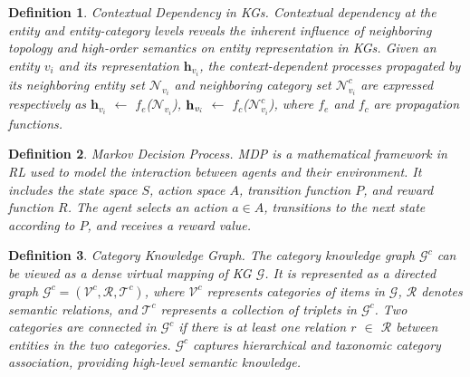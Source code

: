 \documentclass[conference]{IEEEtran}
\newtheorem{defn}{Definition}
\begin{document}
 \begin{defn}
 \emph{Contextual Dependency in KGs}.  Contextual dependency at the entity and entity-category levels reveals the inherent influence of neighboring topology and high-order semantics on entity representation in KGs. %
 Given an entity $v_i$ and its representation $\textbf{h}_{v_i}$, the context-dependent processes propagated by its neighboring entity set $\mathcal{N}_{v_i}$ and neighboring category set $\mathcal{N}^c_{v_i}$ are  expressed respectively as $\textbf{h}_{v_i}$ $\leftarrow$ $f_e$($\mathcal{N}_{v_i}$), $\textbf{h}_{\emph{v}_{\emph{i}}}$ $\leftarrow$ $f_c$($\mathcal{N}^c_{v_i}$), where $f_e$ and $f_c$ are propagation functions.





 
\end{defn}

\begin{defn}
 \emph{Markov Decision Process}. MDP is a mathematical framework in RL used to model  the interaction between agents and their environment. It includes the state space $S$, action space $A$,  transition function $P$, and reward function $R$. The agent selects an action $a \in A$, transitions to the next state according to $P$, and receives a reward value.
\end{defn}

\begin{defn}
 \emph{Category Knowledge Graph}. The category knowledge graph $\mathcal{G}^c$ can be viewed as a dense virtual mapping of KG $\mathcal{G}$. It is represented as a directed graph $\mathcal{G}^c = (\mathcal{V}^c, \mathcal{R}, \mathcal{T}^c)$, where $\mathcal{V}^c$ represents categories of items in $\mathcal{G}$, $\mathcal{R}$ denotes semantic relations, and $\mathcal{T}^c$ represents a collection of triplets in $\mathcal{G}^c$. Two categories are connected in $\mathcal{G}^c$ if there is at least one relation $r$ $\in$ $\mathcal{R}$ between entities in the two categories. $\mathcal{G}^c$ captures hierarchical and taxonomic category association, providing high-level  semantic knowledge. 
\end{defn}
\end{document}
